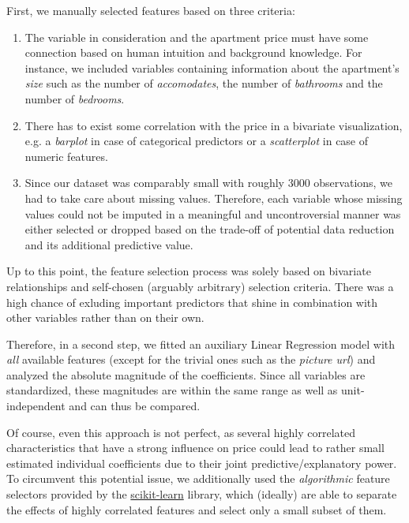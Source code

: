 First, we manually selected features based on three criteria:
\begin{enumerate}
  \item The variable in consideration and the apartment price must have some connection based on human intuition and background knowledge. For instance, we included variables containing information about the apartment's \emph{size} such as the number of \emph{accomodates}, the number of \emph{bathrooms} and the number of \emph{bedrooms}.
  \item There has to exist some correlation with the price in a bivariate visualization, e.g. a \emph{barplot} in case of categorical predictors or a \emph{scatterplot} in case of numeric features.
  \item Since our dataset was comparably small with roughly $3000$ observations, we had to take care about missing values.
        Therefore, each variable whose missing values could not be imputed in a meaningful and uncontroversial manner was either selected or dropped based on the trade-off of potential data reduction and its additional predictive value.
\end{enumerate}

Up to this point, the feature selection process was solely based on bivariate relationships and self-chosen (arguably arbitrary) selection criteria.
There was a high chance of exluding important predictors that shine in combination with other variables rather than on their own.

Therefore, in a second step, we fitted an auxiliary Linear Regression model with \emph{all} available features (except for the trivial ones such as the \emph{picture url}) and analyzed the absolute magnitude of the coefficients.
Since all variables are standardized, these magnitudes are within the same range as well as unit-independent and can thus be compared.

Of course, even this approach is not perfect, as several highly correlated characteristics that have a strong influence on price could lead to rather small estimated individual coefficients due to their joint predictive/explanatory power.
To circumvent this potential issue, we additionally used the \emph{algorithmic} feature selectors provided by the \href{https://scikit-learn.org/stable/index.html}{scikit-learn} library, which (ideally) are able to separate the effects of highly correlated features and select only a small subset of them.

